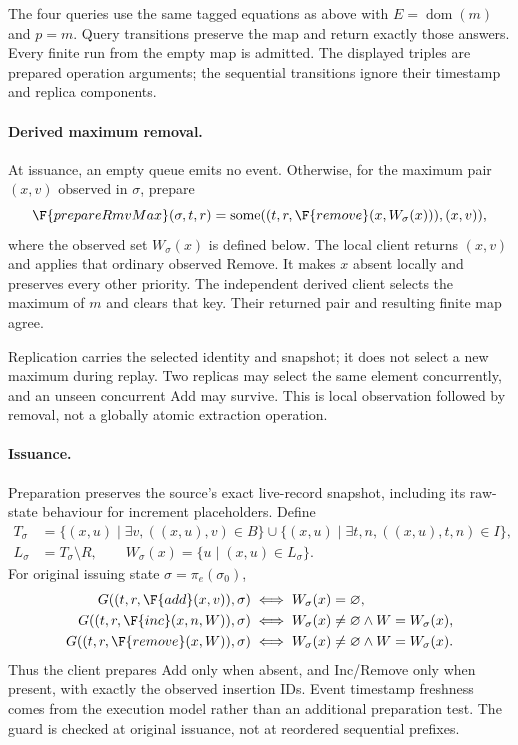The four queries use the same tagged equations as above with
$E=\operatorname{dom}(m)$ and $p=m$. Query transitions preserve the map
and return exactly those answers. Every finite run from the empty map is
admitted. The displayed triples are prepared operation arguments; the
sequential transitions ignore their timestamp and replica components.

\paragraph{Derived maximum removal.}
At issuance, an empty queue emits no event. Otherwise, for the maximum
pair $(x,v)$ observed in $\sigma$, prepare
\[
\F{prepareRmvMax}(\sigma,t,r)=
 \operatorname{some}((t,r,\F{remove}(x,W_\sigma(x))),(x,v)),
\]
where the observed set $W_\sigma(x)$ is defined below. The local client
returns $(x,v)$ and applies that ordinary observed Remove. It makes $x$
absent locally and preserves every other priority. The independent derived
client selects the maximum of $m$ and clears that key. Their returned pair
and resulting finite map agree.

Replication carries the selected identity and snapshot; it does not select
a new maximum during replay. Two replicas may select the same element
concurrently, and an unseen concurrent Add may survive. This is local
observation followed by removal, not a globally atomic extraction operation.

\paragraph{Issuance.}
Preparation preserves the source's exact live-record snapshot, including
its raw-state behaviour for increment placeholders. Define
\[
\begin{aligned}
T_\sigma&=\{(x,u)\mid\exists v,((x,u),v)\in B\}
 \cup\{(x,u)\mid\exists t,n,((x,u),t,n)\in I\},\\
L_\sigma&=T_\sigma\setminus R,\qquad
W_\sigma(x)=\{u\mid(x,u)\in L_\sigma\}.
\end{aligned}
\]
For original issuing state $\sigma=\pi_e(\sigma_0)$,
\[
\begin{aligned}
G((t,r,\F{add}(x,v)),\sigma)&\iff W_\sigma(x)=\varnothing,\\
G((t,r,\F{inc}(x,n,W)),\sigma)&\iff
 W_\sigma(x)\ne\varnothing\land W=W_\sigma(x),\\
G((t,r,\F{remove}(x,W)),\sigma)&\iff
 W_\sigma(x)\ne\varnothing\land W=W_\sigma(x).
\end{aligned}
\]
Thus the client prepares Add only when absent, and Inc/Remove only when
present, with exactly the observed insertion IDs. Event timestamp freshness
comes from the execution model rather than an additional preparation test.
The guard is checked at original issuance, not at reordered sequential prefixes.

